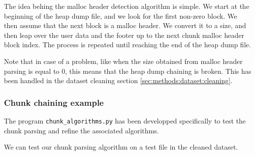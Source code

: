     The idea behing the malloc header detection algorithm is simple. We start at the beginning of the heap dump file, and we look for the first non-zero block. We then assume that the next block is a malloc header. We convert it to a size, and then leap over the user data and the footer up to the next chunk malloc header block index. The process is repeated until reaching the end of the heap dump file.

    Note that in case of a problem, like when the size obtained from malloc header parsing is equal to 0, this means that the heap dump chaining is broken. This has been handled in the dataset cleaning section \ref{sec:methods:dataset:cleaning}. 

    \subsubsection{Chunk chaining example}
    The program \texttt{chunk\_algorithms.py} has been developped specifically to test the chunk parsing and refine the associated algorithms.

    We can test our chunk parsing algorithm on a test file in the cleaned dataset.

